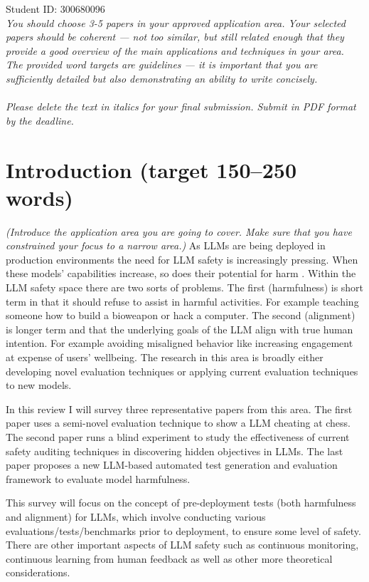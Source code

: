 \documentclass{article}[11pt]
\begin{document}
\noindent Student ID: 300680096 \\
\noindent \textit{You should choose 3-5 papers in your approved application area. Your selected papers should be coherent --- not too similar, but still related enough that they provide a good overview of the main applications and techniques in your area. The provided word targets are guidelines --- it is important that you are sufficiently detailed but also demonstrating an ability to write concisely.\\ \\
Please delete the text in italics for your final submission. Submit in PDF format by the deadline.
}

\section*{Introduction (target 150--250 words)}
\begin{mdframed}[] %
\textit{(Introduce the application area you are going to cover. Make sure that you have constrained your focus to a narrow area.)}
As LLMs are being deployed in production environments the need for LLM safety is increasingly pressing. When these models' capabilities increase, so does their potential for harm \cite{shevlaneModelEvaluationExtreme2023,kangExploitingProgrammaticBehavior2023}. Within the LLM safety space there are two sorts of problems. The first (harmfulness) is short term in that it should refuse to assist in harmful activities. For example teaching someone how to build a bioweapon or hack a computer. The second (alignment) is longer term and that the underlying goals of the LLM align with true human intention.  For example avoiding misaligned behavior like increasing engagement at expense of users' wellbeing. The research in this area is broadly either developing novel evaluation techniques or applying current evaluation techniques to new models.

In this review I will survey three representative papers from this area. The first paper \cite{bondarenkoDemonstratingSpecificationGaming2025} uses a semi-novel evaluation technique to show a LLM cheating at chess. The second paper \cite{marksAuditingLanguageModels2025} runs a blind experiment to study the effectiveness of current safety auditing techniques in discovering hidden objectives in LLMs. The last paper \cite{yuanSEvalAutomatedComprehensive2025} proposes a new LLM-based automated test generation and evaluation framework to evaluate model harmfulness.

This survey will focus on the concept of pre-deployment tests (both harmfulness and alignment) for LLMs, which involve conducting various evaluations/tests/benchmarks prior to deployment, to ensure some level of safety. There are other important aspects of LLM safety such as continuous monitoring, continuous learning from human feedback as well as other more theoretical considerations.

\end{mdframed}
\end{document}
